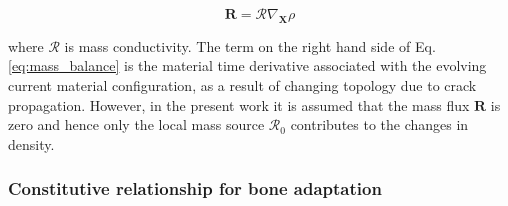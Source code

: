 \documentclass[review]{elsarticle}
\numberwithin{equation}{section}
\begin{document}
\begin{equation}
\mathbf{R} = \mathcal{R} \nabla_\mathbf{X} \rho
\label{eq:mass_flux}
\end{equation}

where $\mathcal{R}$ is mass conductivity. The term on the right hand side of Eq. \ref{eq:mass_balance}
is the material time derivative associated with the evolving current material
configuration, as a result of changing topology due to crack propagation. 
However, in the present work it is assumed that the mass flux $\mathbf{R}$ is zero and hence only the local mass source $\mathcal{R}_0$ contributes to the changes in density.


\subsubsection{Constitutive relationship for bone adaptation}

\label{sec:constitutive_eq}
\end{document}
